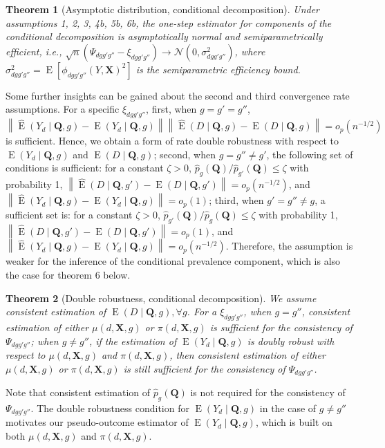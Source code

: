 \documentclass[12pt,a4paper]{article}
\newtheorem{prop}{Theorem}
\newcommand{\E}{\operatorname{E}}
\def\X{{\boldsymbol X}}
\def\Q{{\boldsymbol Q}}
\begin{document}
\begin{prop}[Asymptotic distribution, conditional decomposition]
Under assumptions 1, 2, 3, 4b, 5b, 6b, the one-step estimator for components of the conditional decomposition is asymptotically normal and semiparametrically efficient, i.e., $\sqrt{n} \left( \Psi_{dgg'g''} - \xi_{dgg'g''} \right) \xrightarrow{} \mathcal{N}(0, \sigma^2_{dgg'g''})$, where $\sigma^2_{dgg'g''}=\E \left[\phi_{dgg'g''}(Y,\X)^2 \right]$ is the semiparametric efficiency bound.
\end{prop}
Some further insights can be gained about the second and third convergence rate assumptions. For a specific $\xi_{dgg'g''}$, first, when $g=g'=g''$, $\left\| \hat{\E}\left( Y_d \mid \Q, g \right) - \E(Y_d \mid \Q,g)  \right\| \left\| \hat{\E}(D \mid \Q, g) - \E(D \mid \Q, g)  \right\| = o_p(n^{-1/2})$ is sufficient. Hence, we obtain a form of rate double robustness with respect to $\E(Y_d \mid \Q,g)$ and $\E(D \mid \Q, g)$; second, when $g= g'' \neq g'$, the following set of conditions is sufficient: for a constant $\zeta>0$, $\hat{p}_g(\Q)/\hat{p}_{g'}(\Q) \leq \zeta$ with probability 1, $\left\| \hat{\E}(D \mid \Q, g') - \E(D \mid \Q, g') \right\|=o_p(n^{-1/2})$, and $ \left\| \hat{\E}\left( Y_d \mid \Q, g \right) - \E(Y_d \mid \Q,g) \right\|=o_p(1)$; third, when $g'=g'' \neq g$, a sufficient set is: for a constant $\zeta>0$, $ \hat{p}_{g'}(\Q)/\hat{p}_{g}(\Q) \leq \zeta$ with probability 1, $\left\| \hat{\E}(D \mid \Q, g') - \E(D \mid \Q, g') \right\|=o_p(1)$, and $\left\| \hat{\E}\left( Y_d \mid \Q, g \right) - \E(Y_d \mid \Q,g)  \right\|=o_p(n^{-1/2})$. Therefore, the assumption is weaker for the inference of the conditional prevalence component, which is also the case for theorem 6 below.

\begin{prop}[Double robustness, conditional decomposition]
We assume consistent estimation of $\E(D \mid \Q, g), \forall g$. For a $\xi_{dgg'g''}$, when $g=g''$, consistent estimation of either $\mu(d,\X,g)$ or $\pi(d,\X,g)$ is sufficient for the consistency of $\Psi_{dgg'g''}$; when $g \neq g''$, if the estimation of $\E(Y_d \mid \Q,g)$ is doubly robust with respect to $\mu(d,\X,g)$ and $\pi(d,\X,g)$, then consistent estimation of either $\mu(d,\X,g)$ or $\pi(d,\X,g)$ is still sufficient for the consistency of $\Psi_{dgg'g''}$.
\end{prop}
Note that consistent estimation of $\hat{p}_g(\Q)$ is not required for the consistency of $\Psi_{dgg'g''}$. The double robustness condition for $\E(Y_d \mid \Q,g)$ in the case of $g \neq g''$ motivates our pseudo-outcome estimator of $\E(Y_d \mid \Q,g)$, which is built on both $\mu(d,\X,g)$ and $\pi(d,\X,g)$.
\end{document}
